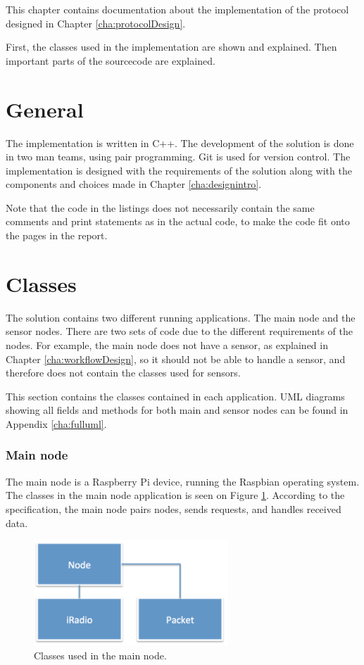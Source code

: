 This chapter contains documentation about the implementation of the protocol designed in Chapter \ref{cha:protocolDesign}. 

First, the classes used in the implementation are shown and explained. Then important parts of the sourcecode are explained.
 

\section{General}
The implementation is written in C++. The development of the solution is done in two man teams, using pair programming. Git is used for version control. The implementation is designed with the requirements of the solution along with the components and choices made in Chapter \ref{cha:designintro}. 

Note that the code in the listings does not necessarily contain the same comments and print statements as in the actual code, to make the code fit onto the pages in the report.

\section{Classes}
The solution contains two different running applications. The main node and the sensor nodes. There are two sets of code due to the different requirements of the nodes. For example, the main node does not have a sensor, as explained in Chapter \ref{cha:workflowDesign}, so it should not be able to handle a sensor, and therefore does not contain the classes used for sensors.

This section contains the classes contained in each application. UML diagrams showing all fields and methods for both main and sensor nodes can be found in Appendix \ref{cha:fulluml}.

\subsubsection*{Main node}
The main node is a Raspberry Pi device, running the Raspbian operating system. The classes in the main node application is seen on Figure \ref{fig:mainnodeClass}. 
According to the specification, the main node pairs nodes, sends requests, and handles received data.

\begin{figure}[h!]
\centering
\includegraphics[width=0.65\textwidth]{chapters/implementation/figures/mainnodeClass.png}
\caption{Classes used in the main node.}
\label{fig:mainnodeClass}
\end{figure}



